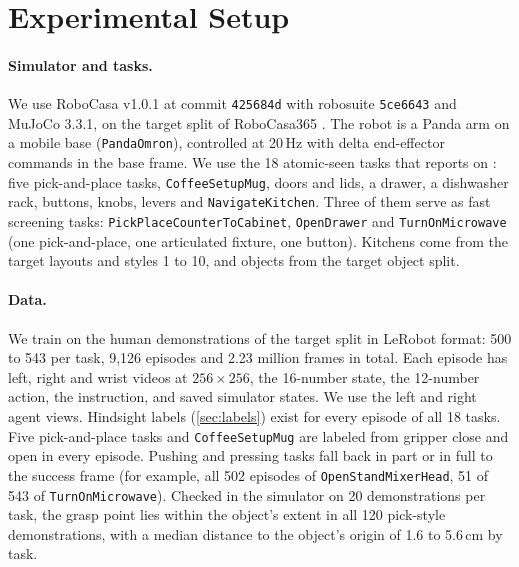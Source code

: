 \section{Experimental Setup}
\label{sec:setup}



\paragraph{Simulator and tasks.} We use RoboCasa v1.0.1
\citep{nasiriany2024robocasa} at commit \texttt{425684d} with robosuite
\texttt{5ce6643} and MuJoCo 3.3.1, on the target split of RoboCasa365
\citep{nasiriany2026robocasa365}. The robot is a Panda arm on a mobile base
(\texttt{PandaOmron}), controlled at 20\,Hz with delta end-effector commands
in the base frame. We use the 18 atomic-seen tasks that \dem{} reports on
\citep{sun2026dem}: five pick-and-place tasks, \texttt{CoffeeSetupMug},
doors and lids, a drawer, a dishwasher rack, buttons, knobs, levers and
\texttt{NavigateKitchen}. Three of them serve as fast screening tasks:
\texttt{PickPlaceCounterToCabinet}, \texttt{OpenDrawer} and
\texttt{TurnOnMicrowave} (one pick-and-place, one articulated fixture, one
button). Kitchens come from the target layouts and styles 1 to 10, and
objects from the target object split.

\paragraph{Data.} We train on the human demonstrations of the target split
in LeRobot format: 500 to 543 per task, 9,126 episodes and 2.23 million
frames in total. Each episode has left, right and wrist videos at
$256\times256$, the 16-number state, the 12-number action, the instruction,
and saved simulator states. We use the left and right agent views.
Hindsight labels (\cref{sec:labels}) exist for every episode of all 18 tasks.
Five pick-and-place tasks and \texttt{CoffeeSetupMug} are labeled from
gripper close and open in every episode. Pushing and pressing tasks fall back
in part or in full to the success frame (for example, all 502 episodes of
\texttt{OpenStandMixerHead}, 51 of 543 of \texttt{TurnOnMicrowave}).
Checked in the simulator on 20 demonstrations per task, the grasp point lies
within the object's extent in all 120 pick-style demonstrations, with a
median distance to the object's origin of 1.6 to 5.6\,cm by task.

